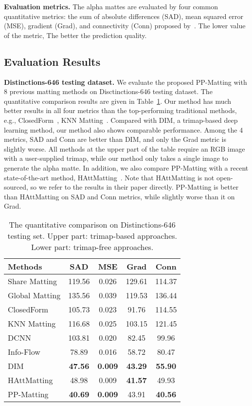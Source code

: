\documentclass[10pt,twocolumn,letterpaper]{article}
\begin{document}
\textbf{Evaluation metrics.} The alpha mattes are evaluated by four common quantitative metrics: the sum of absolute differences (SAD), mean squared error (MSE), gradient (Grad), and connectivity (Conn) proposed by~\cite{rhemann2009perceptually}. The lower value of the metric, The better the prediction quality.


\subsection{Evaluation Results}

\textbf{Distinctions-646 testing dataset.} We evaluate the proposed PP-Matting with 8 previous matting methods on Disctinctions-646 testing dataset. The quantitative comparison results are given in Table~\ref{tab:distinctions}. Our method has much better results in all four metrics than the top-performing traditional methods, e.g., ClosedForm~\cite{levin2007closed}, KNN Matting~\cite{chen2013knn}. Compared with DIM, a trimap-based deep learning method, our method also shows comparable performance. Among the 4 metrics, SAD and Conn are better than DIM, and only the Grad metric is slightly worse. All methods at the upper part of the table require an RGB image with a user-supplied trimap, while our method only takes a single image to generate the alpha matte. In addition, we also compare PP-Matting with a recent state-of-the-art method, HAttMatting~\cite{qiao2020attention}. Note that HAttMatting is not open-sourced, so we refer to the results in their paper directly. PP-Matting is better than HAttMatting on SAD and Conn metrics, while slightly worse than it on Grad.

\begin{table}
  \centering
  \begin{tabular}{@{}lcccc@{}}
    \toprule
    Methods & SAD & MSE & Grad & Conn \\
    \midrule
    Share Matting \cite{gastal2010shared} & 119.56 & 0.026 & 129.61 & 114.37 \\
    Global Matting\cite{he2011global} & 135.56 & 0.039 & 119.53 & 136.44 \\
    ClosedForm \cite{levin2007closed} & 105.73 & 0.023 & 91.76 & 114.55 \\
    KNN Matting \cite{chen2013knn} & 116.68 & 0.025 & 103.15 & 121.45 \\
    DCNN \cite{shen2016deep} & 103.81 & 0.020 & 82.45 & 99.96 \\
    Info-Flow \cite{aksoy2017designing} & 78.89 & 0.016 & 58.72 & 80.47 \\
    DIM \cite{xu2017deep} & \bf{47.56} & \bf{0.009} & \bf{43.29} & \bf{55.90} \\
    \midrule
    HAttMatting \cite{qiao2020attention} & 48.98 & 0.009 & \bf{41.57} & 49.93 \\
PP-Matting & \bf{40.69} & \bf{0.009} & 43.91 & \bf{40.56} \\
    \bottomrule
  \end{tabular}
  \caption{The quantitative comparison on Distinctions-646 testing set. Upper part: trimap-based approaches. Lower part: trimap-free approaches.}
  \label{tab:distinctions}
\end{table}
\end{document}
